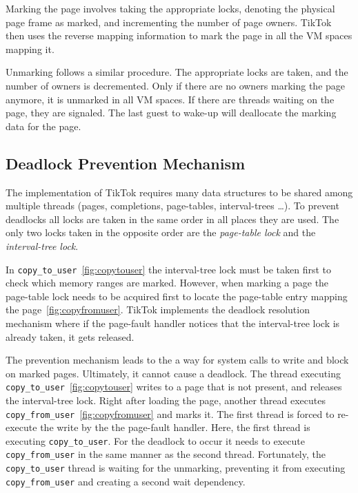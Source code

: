 \documentclass[conference]{IEEEtran}
\newcommand{\sysname}{TikTok}
\begin{document}
Marking the page involves taking the appropriate locks, denoting the physical
page frame as marked, and incrementing the number of page owners. \sysname{} then
uses the reverse mapping information to mark the page in all the VM spaces
mapping it.

Unmarking follows a similar procedure. The appropriate locks are taken, and the
number of owners is decremented. Only if there are no owners marking the page
anymore, it is unmarked in all VM spaces. If there are threads waiting on the
page, they are signaled. The last guest to wake-up will deallocate the marking
data for the page.

\subsection{Deadlock Prevention Mechanism}

The implementation of \sysname{} requires many data structures to be shared
among multiple threads (pages, completions, page-tables, interval-trees \ldots).
To prevent deadlocks all locks are taken in the same order in all places they
are used. The only two locks taken in the opposite order are the
\emph{page-table lock} and the \emph{interval-tree lock}.

In \texttt{copy\_to\_user}~\autoref{fig:copytouser} the interval-tree lock must
be taken first to check which memory ranges are marked. However, when marking a
page the page-table lock needs to be acquired first to locate the page-table
entry mapping the page~\autoref{fig:copyfromuser}. \sysname{} implements the
deadlock resolution mechanism where if the page-fault handler notices that the
interval-tree lock is already taken, it gets released.

The prevention mechanism leads to the a way for system calls to write and block
on marked pages. Ultimately, it cannot cause a deadlock. The thread executing
\texttt{copy\_to\_user}~\autoref{fig:copytouser} writes to a page that is not
present, and releases the interval-tree lock. Right after loading the page,
another thread executes \texttt{copy\_from\_user}~\autoref{fig:copyfromuser} and
marks it. The first thread is forced to re-execute the write by the the
page-fault handler. Here, the first thread is executing \texttt{copy\_to\_user}.
For the deadlock to occur it needs to execute \texttt{copy\_from\_user} in the
same manner as the second thread. Fortunately, the \texttt{copy\_to\_user}
thread is waiting for the unmarking, preventing it from executing
\texttt{copy\_from\_user} and creating a second wait dependency.
\end{document}
